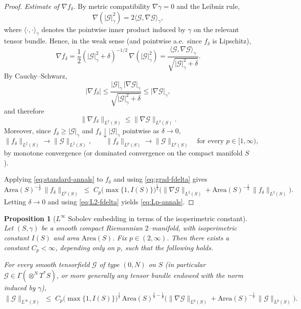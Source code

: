 \documentclass{amsart}
\newtheorem{proposition}{Proposition}[section]
\begin{document}
{\begin{proof}
\medskip

\noindent\emph{Estimate of $\nabla f_\delta$.}
By metric compatibility $\nabla\gamma=0$ and the Leibniz rule,
\[
\nabla(|\mathcal G|_\gamma^2)
=
2\langle \mathcal G,\nabla\mathcal G\rangle_\gamma,
\]
where $\langle\cdot,\cdot\rangle_\gamma$ denotes the pointwise inner product induced by $\gamma$ on the relevant tensor bundle.
Hence, in the weak sense (and pointwise a.e.\ since $f_\delta$ is Lipschitz),
\[
\nabla f_\delta
=
\frac{1}{2}(|\mathcal G|_\gamma^{2}+\delta)^{-1/2}\,\nabla(|\mathcal G|_\gamma^2)
=
\frac{\langle \mathcal G,\nabla\mathcal G\rangle_\gamma}{\sqrt{|\mathcal G|_\gamma^{2}+\delta}}.
\]
By Cauchy--Schwarz,
\[
|\nabla f_\delta|
\le
\frac{|\mathcal G|_\gamma\,|\nabla\mathcal G|_\gamma}{\sqrt{|\mathcal G|_\gamma^{2}+\delta}}
\le
|\nabla\mathcal G|_\gamma,
\]
and therefore
\begin{equation}\label{eq:grad-fdelta}
\|\nabla f_\delta\|_{L^2(S)}\le \|\nabla\mathcal G\|_{L^2(S)}.
\end{equation}
Moreover, since $f_\delta\ge |\mathcal G|_\gamma$ and $f_\delta\downarrow |\mathcal G|_\gamma$ pointwise as $\delta\to0$,
\begin{equation}\label{eq:L2-fdelta}
\|f_\delta\|_{L^2(S)}\to \|\mathcal G\|_{L^2(S)},
\qquad
\|f_\delta\|_{L^p(S)}\to \|\mathcal G\|_{L^p(S)}
\quad\text{for every }p\in[1,\infty),
\end{equation}
by monotone convergence (or dominated convergence on the compact manifold $S$).

\medskip
\noindent Applying \eqref{eq:standard-annals} to $f_\delta$ and using \eqref{eq:grad-fdelta} gives
\[
\text{Area}(S)^{-\frac1p}\,\|f_\delta\|_{L^p(S)}
\;\le\;
C_p\big(\max\{1,I(S)\}\big)^{\frac12}
\Big(
\|\nabla \mathcal G\|_{L^2(S)}
+
\text{Area}(S)^{-\frac12}\,\|f_\delta\|_{L^2(S)}
\Big).
\]
Letting $\delta\to0$ and using \eqref{eq:L2-fdelta} yields \eqref{eq:Lp-annals}.
\end{proof}

\begin{proposition}[$L^\infty$ Sobolev embedding in terms of the isoperimetric constant]
\label{prop:Linfty-isoper}
Let $(S,\gamma)$ be a smooth compact Riemannian $2$--manifold, with isoperimetric constant $I(S)$ and area $\text{Area}(S)$. Fix $p\in(2,\infty)$. Then there exists a constant $C_p<\infty$, depending only on $p$, such that the following holds.

\noindent For every smooth tensorfield $\mathcal G$ of type $(0,N)$ on $S$ (in particular $\mathcal G\in\Gamma(\otimes^N T^*S)$, or more generally any tensor bundle endowed with the norm induced by $\gamma$),
\begin{equation}\label{eq:Linfty-annals}
\|\mathcal G\|_{L^\infty(S)}
\;\le\;
C_p\big(\max\{1,I(S)\}\big)^{\frac12}\,
\text{Area}(S)^{\frac12-\frac1p}
\Big(
\|\nabla\mathcal G\|_{L^p(S)}
+
\text{Area}(S)^{-\frac12}\,\|\mathcal G\|_{L^p(S)}
\Big).
\end{equation}
\end{proposition}

}
\end{document}
